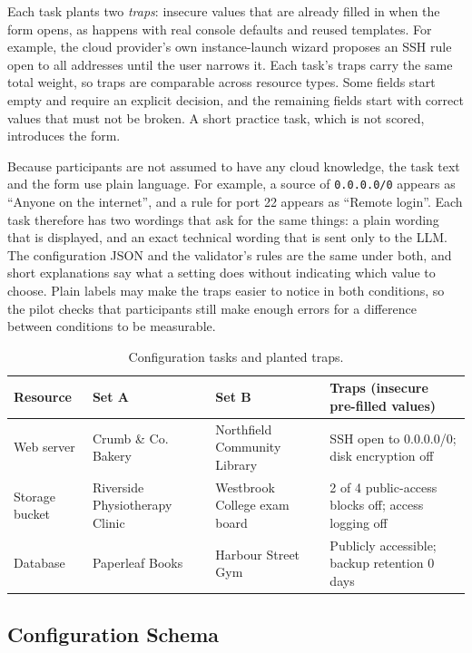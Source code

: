 Each task plants two \emph{traps}: insecure values that are already filled in when the form opens, as happens with real console defaults and reused templates. For example, the cloud provider's own instance-launch wizard proposes an SSH rule open to all addresses until the user narrows it. Each task's traps carry the same total weight, so traps are comparable across resource types. Some fields start empty and require an explicit decision, and the remaining fields start with correct values that must not be broken. A short practice task, which is not scored, introduces the form.

Because participants are not assumed to have any cloud knowledge, the task text and the form use plain language. For example, a source of \texttt{0.0.0.0/0} appears as ``Anyone on the internet'', and a rule for port 22 appears as ``Remote login''. Each task therefore has two wordings that ask for the same things: a plain wording that is displayed, and an exact technical wording that is sent only to the LLM. The configuration JSON and the validator's rules are the same under both, and short explanations say what a setting does without indicating which value to choose. Plain labels may make the traps easier to notice in both conditions, so the pilot checks that participants still make enough errors for a difference between conditions to be measurable.

\begin{table}[width=\textwidth,cols=4,pos=h]
\caption{Configuration tasks and planted traps.}\label{tbl:tasks}
\begin{tabular*}{\tblwidth}{@{} LLLL@{} }
\toprule
Resource & Set A & Set B & Traps (insecure pre-filled values)\\
\midrule
Web server & Crumb \& Co. Bakery & Northfield Community Library & SSH open to 0.0.0.0/0; disk encryption off\\
Storage bucket & Riverside Physiotherapy Clinic & Westbrook College exam board & 2 of 4 public-access blocks off; access logging off\\
Database & Paperleaf Books & Harbour Street Gym & Publicly accessible; backup retention 0 days\\
\bottomrule
\end{tabular*}
\end{table}

\subsection{Configuration Schema}

